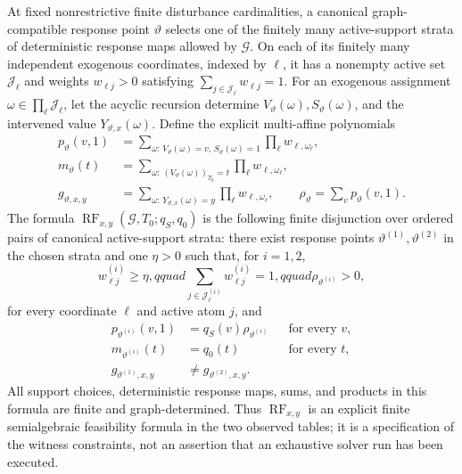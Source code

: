 At fixed nonrestrictive finite disturbance cardinalities, a canonical graph-compatible response point \(\vartheta\) selects one of the finitely many active-support strata of deterministic response maps allowed by \(\mathcal G\).  On each of its finitely many independent exogenous coordinates, indexed by \(\ell\), it has a nonempty active set \(\mathcal J_\ell\) and weights \(w_{\ell j}>0\) satisfying \(\sum_{j\in\mathcal J_\ell}w_{\ell j}=1\).  For an exogenous assignment \(\omega\in\prod_\ell\mathcal J_\ell\), let the acyclic recursion determine \(V_\vartheta(\omega),S_\vartheta(\omega)\), and the intervened value \(Y_{\vartheta,x}(\omega)\).  Define the explicit multi-affine polynomials
\[
 \begin{aligned}
 p_\vartheta(v,1)
 &=\sum_{\omega:\,V_\vartheta(\omega)=v,\,S_\vartheta(\omega)=1}
      \prod_\ell w_{\ell,\omega_\ell},\\
 m_\vartheta(t)
 &=\sum_{\omega:\,(V_\vartheta(\omega))_{T_0}=t}
      \prod_\ell w_{\ell,\omega_\ell},\\
 g_{\vartheta,x,y}
 &=\sum_{\omega:\,Y_{\vartheta,x}(\omega)=y}
      \prod_\ell w_{\ell,\omega_\ell},
 \qquad
 \rho_\vartheta=\sum_vp_\vartheta(v,1).
 \end{aligned}
\]
The formula \(\operatorname{RF}_{x,y}(\mathcal G,T_0;q_S,q_0)\) is the following finite disjunction over ordered pairs of canonical active-support strata: there exist response points \(\vartheta^{(1)},\vartheta^{(2)}\) in the chosen strata and one \(\eta>0\) such that, for \(i=1,2\),
\[
 w^{(i)}_{\ell j}\geq\eta,qquad
 \sum_{j\in\mathcal J^{(i)}_\ell}w^{(i)}_{\ell j}=1,qquad
 \rho_{\vartheta^{(i)}}>0,
\]
for every coordinate \(\ell\) and active atom \(j\), and
\[
 \begin{aligned}
 p_{\vartheta^{(i)}}(v,1)&=q_S(v)\rho_{\vartheta^{(i)}}
 &&\text{for every }v,\\
 m_{\vartheta^{(i)}}(t)&=q_0(t)
 &&\text{for every }t,\\
 g_{\vartheta^{(1)},x,y}&\neq g_{\vartheta^{(2)},x,y}.&&
 \end{aligned}
\]
All support choices, deterministic response maps, sums, and products in this formula are finite and graph-determined.  Thus \(\operatorname{RF}_{x,y}\) is an explicit finite semialgebraic feasibility formula in the two observed tables; it is a specification of the witness constraints, not an assertion that an exhaustive solver run has been executed.